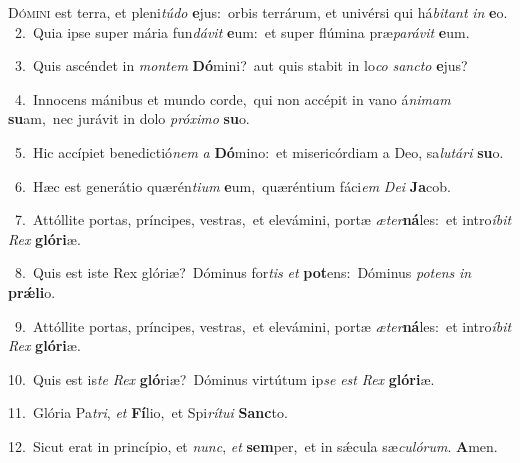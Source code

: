 \lettrine{\initial\textcolor{\initialcolor}{D}}{ómini} est terra, et pleni\-\textit{tú}\-\textit{do} \textbf{e}\-jus:~\star orbis terrárum, et univérsi qui há\-\textit{bi}\-\textit{tant} \textit{in} \textbf{e}\-o.\\
{\numbfont\textcolor{\numbcolor}{~2.}}~Quia ipse super mária fun\-\textit{dá}\-\textit{vit} \textbf{e}\-um:~\star et super flúmina præ\-\textit{pa}\-\textit{rá}\textit{vit} \textbf{e}\-um.\par
{\numbfont\textcolor{\numbcolor}{~3.}}~Quis ascéndet in \textit{mon}\-\textit{tem} \textbf{Dó}\-mini?~\star aut quis stabit in lo\textit{co} \textit{sanc}\-\textit{to} \textbf{e}\-jus?\par
{\numbfont\textcolor{\numbcolor}{~4.}}~Innocens mánibus et mundo corde,~\dagger qui non accépit in vano á\-\textit{ni}\-\textit{mam} \textbf{su}\-am,~\star nec jurávit in dolo \textit{pró}\-\textit{xi}\textit{mo} \textbf{su}\-o.\par
{\numbfont\textcolor{\numbcolor}{~5.}}~Hic accípiet benedictió\textit{nem} \textit{a} \textbf{Dó}\-mino:~\star et misericórdiam a Deo, sa\-\textit{lu}\-\textit{tá}\textit{ri} \textbf{su}\-o.\par
{\numbfont\textcolor{\numbcolor}{~6.}}~Hæc est generátio quærén\-\textit{ti}\-\textit{um} \textbf{e}\-um,~\star quæréntium fáci\textit{em} \textit{De}\-\textit{i} \textbf{Ja}\-cob.\par
{\numbfont\textcolor{\numbcolor}{~7.}}~Attóllite portas, príncipes, vestras,~\dagger et elevámini, portæ \textit{æ}\-\textit{ter}\textbf{ná}les:~\star et intro\-\textit{í}\-\textit{bit} \textit{Rex} \textbf{gló}\-\textbf{ri}æ.\par
{\numbfont\textcolor{\numbcolor}{~8.}}~Quis est iste Rex glóriæ?~\dagger Dóminus for\textit{tis} \textit{et} \textbf{pot}\-ens:~\star Dóminus \textit{pot}\-\textit{ens} \textit{in} \textbf{prǽ}\-\textbf{li}o.\par
{\numbfont\textcolor{\numbcolor}{~9.}}~Attóllite portas, príncipes, vestras,~\dagger et elevámini, portæ \textit{æ}\-\textit{ter}\textbf{ná}les:~\star et intro\-\textit{í}\-\textit{bit} \textit{Rex} \textbf{gló}\-\textbf{ri}æ.\par
{\numbfont\textcolor{\numbcolor}{10.}}~Quis est is\textit{te} \textit{Rex} \textbf{gló}\-riæ?~\star Dóminus virtútum ip\textit{se} \textit{est} \textit{Rex} \textbf{gló}\-\textbf{ri}æ.\par
{\numbfont\textcolor{\numbcolor}{11.}}~Glória Pa\-\textit{tri}\-, \textit{et} \textbf{Fí}\-lio,~\star et Spi\-\textit{rí}\-\textit{tu}\textit{i} \textbf{Sanc}\-to.\par
{\numbfont\textcolor{\numbcolor}{12.}}~Sicut erat in princípio, et \textit{nunc}\-, \textit{et} \textbf{sem}\-per,~\star et in sǽcula sæ\-\textit{cu}\-\textit{ló}\textit{rum}. \textbf{A}\-men.\par
